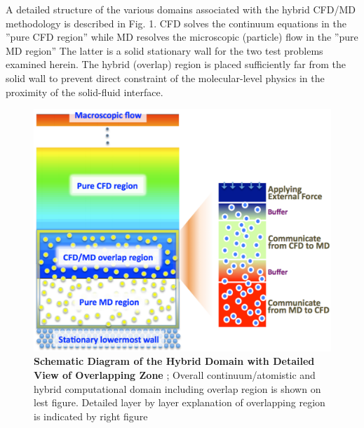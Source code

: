 \documentclass[preprint,12pt]{elsarticle}
\begin{document}
A detailed structure of the various domains associated with the hybrid CFD/MD methodology is described in Fig. 1. CFD solves the continuum equations in the ''pure CFD region'' while MD resolves the microscopic (particle) flow in the ''pure MD region'' The latter is a solid stationary wall for the two test problems examined herein. The hybrid (overlap) region is placed sufficiently far from the solid wall to prevent direct constraint of the molecular-level physics in the proximity of the solid-fluid interface. 

\begin{figure}
\centering
\includegraphics[width=0.8\linewidth]{Hybrid_Schematic.pdf}
\vskip-0.2cm
\caption{\small 
{\bf Schematic Diagram of the Hybrid Domain with Detailed View of Overlapping Zone}
; Overall continuum/atomistic and hybrid computational domain including overlap region is shown on lest figure. Detailed layer by layer explanation of overlapping region is indicated by right figure
}
\label{Fig:Couette}
\vspace{-1em}
\end{figure}
\end{document}
